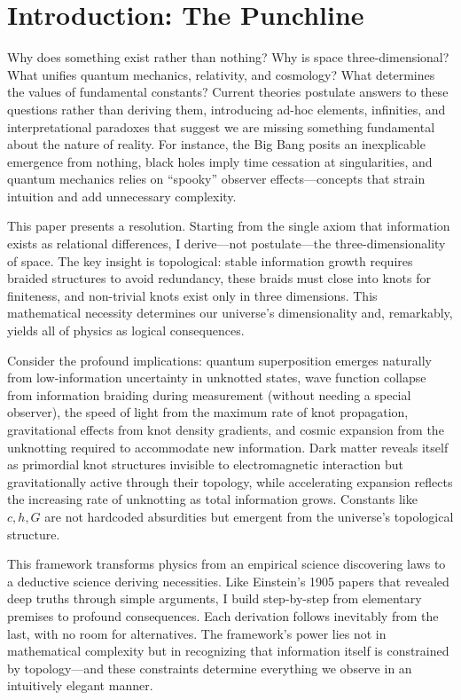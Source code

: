 \documentclass{article}
\begin{document}
\section{Introduction: The Punchline}
Why does something exist rather than nothing? Why is space three-dimensional? What unifies quantum mechanics, relativity, and cosmology? What determines the values of fundamental constants? Current theories postulate answers to these questions rather than deriving them, introducing ad-hoc elements, infinities, and interpretational paradoxes that suggest we are missing something fundamental about the nature of reality. For instance, the Big Bang posits an inexplicable emergence from nothing, black holes imply time cessation at singularities, and quantum mechanics relies on ``spooky'' observer effects—concepts that strain intuition and add unnecessary complexity.

This paper presents a resolution. Starting from the single axiom that information exists as relational differences, I derive—not postulate—the three-dimensionality of space. The key insight is topological: stable information growth requires braided structures to avoid redundancy, these braids must close into knots for finiteness, and non-trivial knots exist only in three dimensions. This mathematical necessity determines our universe's dimensionality and, remarkably, yields all of physics as logical consequences.

Consider the profound implications: quantum superposition emerges naturally from low-information uncertainty in unknotted states, wave function collapse from information braiding during measurement (without needing a special observer), the speed of light from the maximum rate of knot propagation, gravitational effects from knot density gradients, and cosmic expansion from the unknotting required to accommodate new information. Dark matter reveals itself as primordial knot structures invisible to electromagnetic interaction but gravitationally active through their topology, while accelerating expansion reflects the increasing rate of unknotting as total information grows. Constants like $c, h, G$ are not hardcoded absurdities but emergent from the universe's topological structure.

This framework transforms physics from an empirical science discovering laws to a deductive science deriving necessities. Like Einstein's 1905 papers that revealed deep truths through simple arguments, I build step-by-step from elementary premises to profound consequences. Each derivation follows inevitably from the last, with no room for alternatives. The framework's power lies not in mathematical complexity but in recognizing that information itself is constrained by topology—and these constraints determine everything we observe in an intuitively elegant manner.
\end{document}
